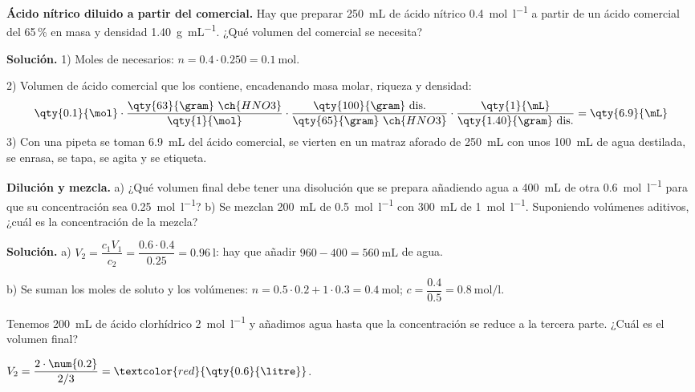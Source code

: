 \begin{example}
    \textbf{Ácido nítrico diluido a partir del comercial.} Hay que preparar \qty{250}{\mL} de ácido nítrico
    \qty{0.4}{\mol\per\litre} a partir de un ácido comercial del 65\,\% en masa y densidad \qty{1.40}{\gram\per\mL}. ¿Qué
    volumen del comercial se necesita?

    \textbf{Solución.} 1) Moles de  necesarios: \(n = \num{0.4} \cdot \num{0.250} = \qty{0.1}{\mol}\).

    2) Volumen de ácido comercial que los contiene, encadenando masa molar, riqueza y densidad:
    \[ \qty{0.1}{\mol} \cdot \frac{\qty{63}{\gram}\ \ch{HNO3}}{\qty{1}{\mol}} \cdot \frac{\qty{100}{\gram}\ \text{dis.}}{\qty{65}{\gram}\ \ch{HNO3}} \cdot
    \frac{\qty{1}{\mL}}{\qty{1.40}{\gram}\ \text{dis.}} = \qty{6.9}{\mL} \]
    3) Con una pipeta se toman \qty{6.9}{\mL} del ácido comercial, se vierten en un matraz aforado de \qty{250}{\mL} con unos
    \qty{100}{\mL} de agua destilada, se enrasa, se tapa, se agita y se etiqueta.
\end{example}

\begin{example}
    \textbf{Dilución y mezcla.} a) ¿Qué volumen final debe tener una disolución que se prepara añadiendo agua a \qty{400}{\mL} de
    otra \qty{0.6}{\mol\per\litre} para que su concentración sea \qty{0.25}{\mol\per\litre}? b) Se mezclan \qty{200}{\mL} de
     \qty{0.5}{\mol\per\litre} con \qty{300}{\mL} de  \qty{1}{\mol\per\litre}. Suponiendo volúmenes aditivos,
    ¿cuál es la concentración de la mezcla?

    \textbf{Solución.} a) \(V_2 = \dfrac{c_1 V_1}{c_2} = \dfrac{\num{0.6} \cdot \num{0.4}}{\num{0.25}} = \qty{0.96}{\litre}\):
    hay que añadir \(960 - 400 = \qty{560}{\mL}\) de agua.

    b) Se suman los moles de soluto y los volúmenes:
    \(n = \num{0.5} \cdot \num{0.2} + 1 \cdot \num{0.3} = \qty{0.4}{\mol}\); \(c = \dfrac{\num{0.4}}{\num{0.5}} = \qty{0.8}{\mol\per\litre}\).
\end{example}

\begin{exercise}
    Tenemos \qty{200}{\mL} de ácido clorhídrico \qty{2}{\mol\per\litre} y añadimos agua hasta que la concentración se reduce a la
    tercera parte. ¿Cuál es el volumen final?
    \begin{solu}
        \(V_2 = \dfrac{2 \cdot \num{0.2}}{2/3} = \textcolor{red}{\qty{0.6}{\litre}}\).
    \end{solu}
\end{exercise}

